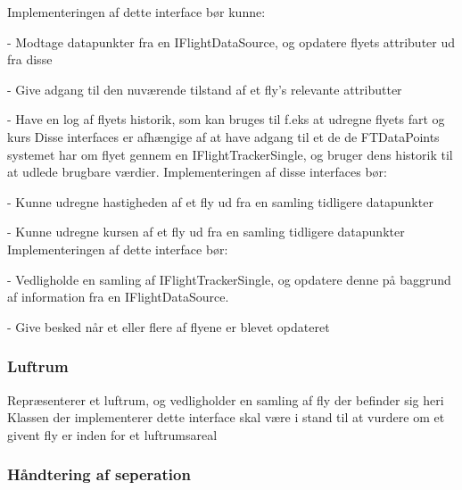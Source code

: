 Implementeringen af dette interface bør kunne:

- Modtage datapunkter fra en IFlightDataSource, og opdatere flyets attributer ud fra disse

- Give adgang til den nuværende tilstand af et fly's relevante attributter

- Have en log af flyets historik, som kan bruges til f.eks at udregne flyets fart og kurs
Disse interfaces er afhængige af at have adgang til et de de FTDataPoints systemet har om flyet gennem en IFlightTrackerSingle, og bruger dens historik til at udlede brugbare værdier.
Implementeringen af disse interfaces bør:

- Kunne udregne hastigheden af et fly ud fra en samling tidligere datapunkter

- Kunne udregne kursen af et fly ud fra en samling tidligere datapunkter
Implementeringen af dette interface bør:

- Vedligholde en samling af IFlightTrackerSingle, og opdatere denne på baggrund af information fra en IFlightDataSource.

- Give besked når et eller flere af flyene er blevet opdateret
\newpage
\subsubsection{Luftrum}

Repræsenterer et luftrum, og vedligholder en samling af fly der befinder sig heri
Klassen der implementerer dette interface skal være i stand til at vurdere om et givent fly er inden for et luftrumsareal
\subsubsection{Håndtering af seperation}
